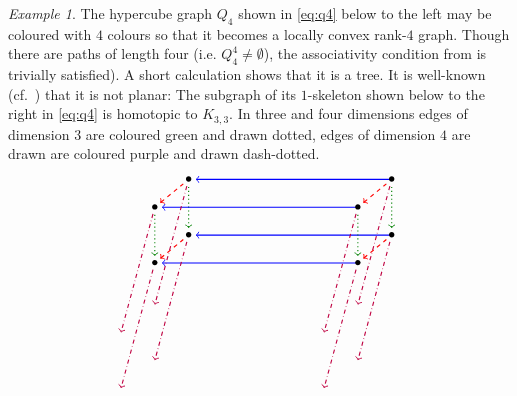 \documentclass[12pt]{amsart}
\theoremstyle{definition}
\theoremstyle{remark}
\newtheorem{example}[thm]{Example}
\numberwithin{equation}{section}
\begin{document}
\begin{example}
The hypercube graph $Q_4$ shown in \eqref{eq:q4} below to the left may be coloured with $4$ colours so that it becomes a locally convex rank-$4$ graph. Though there are paths of length four (i.e. $Q_4^4 \neq \emptyset$), the associativity condition from \cite{hrsw} is trivially satisfied). A short calculation shows that it is a tree. It is well-known (cf.\ \cite{Wikipedia2024}) that it is not planar: The subgraph of its $1$-skeleton shown below to the right in \eqref{eq:q4} is homotopic to $K_{3,3}$. In three and four dimensions edges of dimension $3$ are coloured green and drawn dotted, edges of dimension $4$ are drawn are coloured purple and drawn dash-dotted. 
\begin{equation} \label{eq:q4}
\begin{array}{l}
\begin{tikzpicture}[yscale=0.7,xscale=0.85]

\node[inner sep=1pt,circle] (00) at (0,0) {\tiny $\bullet$};
\node[inner sep=1pt,circle] (11) at (1,1) {\tiny $\bullet$};
\node[inner sep=1pt,circle] (02) at (0,2) {\tiny $\bullet$};
\node[inner sep=1pt,circle] (13) at (1,3) {\tiny $\bullet$};

\draw[<-,green!50!black,dotted,thick] (00) -- (02); 
\draw[<-,green!50!black,dotted,thick] (11) -- (13); 
\draw[<-,red,dashed,thick] (00) -- (11);
\draw[<-,red,dashed,thick] (02) -- (13);


\draw[<-,blue,thick] (00) -- (6,0);
\draw[<-,blue,thick] (13) -- (7,3);
\draw[<-,blue,thick] (11) -- (7,1);
\draw[<-,blue,thick] (02) -- (6,2);

\draw[->,purple,dash dot,thick] (00) -- (-1,-4.5);
\draw[->,purple,dash dot,thick] (11) -- (0,-3.5);
\draw[->,purple,dash dot,thick] (02) -- (-1,-2.5);
\draw[->,purple,dash dot,thick] (13) -- (0,-1.5);

\begin{scope}[xshift=6cm]

\node[inner sep=1pt,circle] (00) at (0,0) {\tiny $\bullet$};
\node[inner sep=1pt,circle] (11) at (1,1) {\tiny $\bullet$};
\node[inner sep=1pt,circle] (02) at (0,2) {\tiny $\bullet$};
\node[inner sep=1pt,circle] (13) at (1,3) {\tiny $\bullet$};

\draw[<-,green!50!black,dotted,thick] (00) -- (02); 
\draw[<-,green!50!black,dotted,thick] (11) -- (13); 
\draw[<-,red,dashed,thick] (00) -- (11);
\draw[<-,red,dashed,thick] (02) -- (13);

\draw[->,purple,dash dot, thick] (00) -- (-1,-4.5);
\draw[->,purple,dash dot, thick] (11) -- (0,-3.5);
\draw[->,purple,dash dot, thick] (02) -- (-1,-2.5);
\draw[->,purple,dash dot,thick] (13) -- (0,-1.5);


\end{scope}
\end{tikzpicture}
\end{array}
\end{equation}
\end{example}
\end{document}
